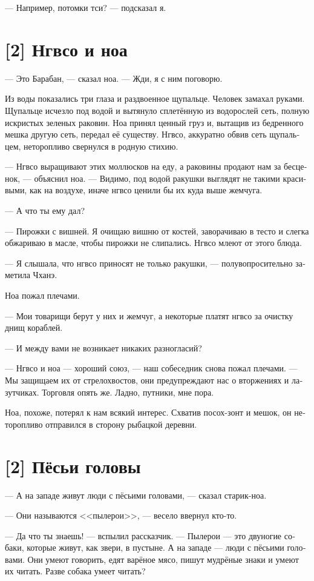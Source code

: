 \documentclass[a4paper,12pt,fleqn]{book}\usepackage{cooltooltips}\usepackage{polyglossia}\setdefaultlanguage[babelshorthands=true]{russian}\setotherlanguage{english}\defaultfontfeatures{Ligatures=TeX,Mapping=tex-text} \usepackage{xcolor}\definecolor{lightgray}{HTML}{bbbbbb}\color{lightgray}\newcommand{\ml}[3]{\textenglish{\textcolor{black}{#3}}}
\begin{document}
{--- Например, потомки тси? --- подсказал я.

\section{[2] Нгвсо и ноа}

--- Это Барабан, --- сказал ноа.
--- Жди, я с ним поговорю.

Из воды показались три глаза и раздвоенное щупальце.
Человек замахал руками.
Щупальце исчезло под водой и вытянуло сплетённую из водорослей сеть, полную искристых зеленых раковин.
Ноа принял ценный груз и, вытащив из бедренного мешка другую сеть, передал её существу.
Нгвсо, аккуратно обвив сеть щупальцем, неторопливо свернулся в родную стихию.

--- Нгвсо выращивают этих моллюсков на еду, а раковины продают нам за бесценок, --- объяснил ноа.
--- Видимо, под водой ракушки выглядят не такими красивыми, как на воздухе, иначе нгвсо ценили бы их куда выше жемчуга.

--- А что ты ему дал?

--- Пирожки с вишней.
Я очищаю вишню от костей, заворачиваю в тесто и слегка обжариваю в масле, чтобы пирожки не слипались.
Нгвсо млеют от этого блюда.

--- Я слышала, что нгвсо приносят не только ракушки, --- полувопросительно заметила Чханэ.

Ноа пожал плечами.

--- Мои товарищи берут у них и жемчуг, а некоторые платят нгвсо за очистку днищ кораблей.

--- И между вами не возникает никаких разногласий?

--- Нгвсо и ноа --- хороший союз, --- наш собеседник снова пожал плечами.
--- Мы защищаем их от стрелохвостов, они предупреждают нас о вторжениях и лазутчиках.
Торговля опять же.
Ладно, путники, мне пора.

Ноа, похоже, потерял к нам всякий интерес.
Схватив посох-зонт и мешок, он неторопливо отправился в сторону рыбацкой деревни.

\section{[2] Пёсьи головы}

--- А на западе живут люди с пёсьими головами, --- сказал старик-ноа.

--- Они называются <<пылерои>>, --- весело ввернул кто-то.

--- Да что ты знаешь! --- вспылил рассказчик.
--- Пылерои --- это двуногие собаки, которые живут, как звери, в пустыне.
А на западе --- люди с пёсьими головами.
Они умеют говорить, едят варёное мясо, пишут мудрёные знаки и умеют их читать.
Разве собака умеет читать?

}
\end{document}
